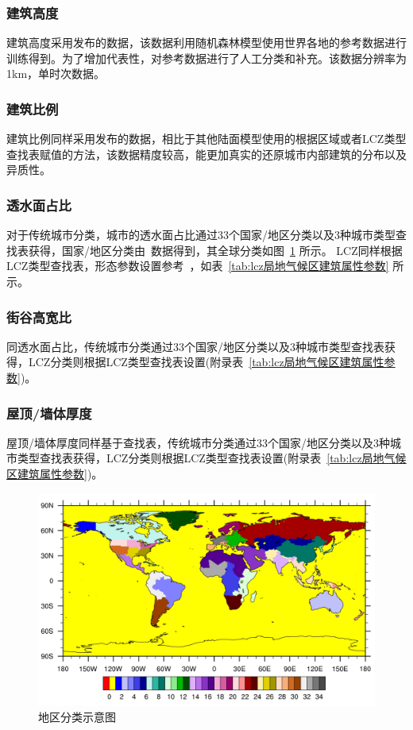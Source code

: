 \subsubsection{建筑高度}\label{建筑高度}
建筑高度采用\citet{li2022global}发布的数据，该数据利用随机森林模型使用世界各地的参考数据进行训练得到。为了增加代表性，\citet{li2022global}对参考数据进行了人工分类和补充。该数据分辨率为1km，单时次数据。
\subsubsection{建筑比例}\label{建筑比例}
建筑比例同样采用\citet{li2022global}发布的数据，相比于其他陆面模型使用的根据区域或者LCZ类型查找表赋值的方法，该数据精度较高，能更加真实的还原城市内部建筑的分布以及异质性。

\subsubsection{透水面占比}\label{透水面占比}
对于传统城市分类，城市的透水面占比通过33个国家/地区分类以及3种城市类型查找表获得，国家/地区分类由~\citet{oleson2020parameterization}数据得到，其全球分类如图~\ref{fig:地区分类} 所示。
LCZ同样根据LCZ类型查找表，形态参数设置参考~\citet{stewart2014evaluation}，如表~\ref{tab:lcz局地气候区建筑属性参数} 所示。

\subsubsection{街谷高宽比}\label{街谷高宽比}
同透水面占比，传统城市分类通过33个国家/地区分类以及3种城市类型查找表获得，LCZ分类则根据LCZ类型查找表设置(附录表~\ref{tab:lcz局地气候区建筑属性参数})。

\subsubsection{屋顶/墙体厚度}\label{屋顶/墙体厚度}
屋顶/墙体厚度同样基于查找表，传统城市分类通过33个国家/地区分类以及3种城市类型查找表获得，LCZ分类则根据LCZ类型查找表设置(附录表~\ref{tab:lcz局地气候区建筑属性参数})。

{
\begin{figure}[htbp]
\centering
\includegraphics[width=.7\paperwidth]{Figures/基础数据/地区分类.jpg}
\caption{地区分类示意图}
\label{fig:地区分类}
\end{figure}
}

